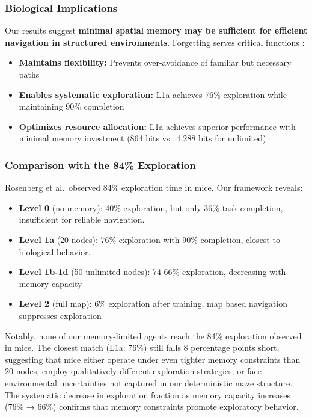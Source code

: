\subsubsection{Biological Implications}

Our results suggest \textbf{minimal spatial memory may be sufficient for efficient navigation in structured environments}. Forgetting serves critical functions \cite{anderson2021,norby2015,ryan2022}:

\begin{itemize}
    \item \textbf{Maintains flexibility:} Prevents over-avoidance of familiar but necessary paths \cite{pravosudov2018}
    \item \textbf{Enables systematic exploration:} L1a achieves 76\% exploration while maintaining 90\% completion
    \item \textbf{Optimizes resource allocation:} L1a achieves superior performance with minimal memory investment (864 bits vs.\ 4,288 bits for unlimited)
\end{itemize}

\subsubsection{Comparison with the 84\% Exploration}

Rosenberg et al.\ observed 84\% exploration time in mice. Our framework reveals:
\begin{itemize}
    \item \textbf{Level 0} (no memory): 40\% exploration, but only 36\% task completion, insufficient for reliable navigation.
    \item \textbf{Level 1a} (20 nodes): 76\% exploration with 90\% completion, closest to biological behavior.
    \item \textbf{Level 1b-1d} (50-unlimited nodes): 74-66\% exploration, decreasing with memory capacity
    \item \textbf{Level 2} (full map): 6\% exploration after training, map based navigation suppresses exploration
\end{itemize}

Notably, none of our memory-limited agents reach the 84\% exploration observed in mice. The closest match (L1a: 76\%) still falls 8 percentage points short, suggesting that mice either operate under even tighter memory constraints than 20 nodes, employ qualitatively different exploration strategies, or face environmental uncertainties not captured in our deterministic maze structure. The systematic decrease in exploration fraction as memory capacity increases (76\% → 66\%) confirms that memory constraints promote exploratory behavior.

